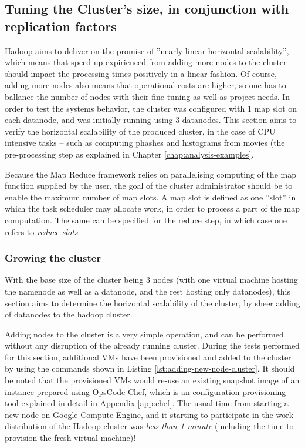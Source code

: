 \subsection{Tuning the Cluster's size, in conjunction with replication factors}
\label{sec:tuning-number-of-nodes}
Hadoop aims to deliver on the promise of ''nearly linear horizontal scalability'', which means that speed-up expirienced from adding more nodes to the cluster should impact the processing times positively in a linear fashion. Of course, adding more nodes also means that operational costs are higher, so one has to ballance the number of nodes with their fine-tuning as well as project needs. In order to test the systems behavior, the cluster was configured with 1 map slot on each datanode, and was initially running using 3 datanodes. This section aims to verify the horizontal scalability of the produced cluster, in the case of CPU intensive tasks -- such as computing phashes and histograms from movies (the pre-processing step as explained in Chapter \ref{chap:analysis-examples}.

Because the Map Reduce framework relies on parallelising computing of the map function supplied by the user, the goal of the cluster administrator should be to enable the maximum number of map slots. A map slot is defined as one ''slot'' in which the task scheduler may allocate work, in order to process a part of the map computation. The same can be specified for the reduce step, in which case one refers to \textit{reduce slots}.

\subsubsection{Growing the cluster}
With the base size of the cluster being 3 nodes (with one virtual machine hosting the namenode as well as a datanode, and the rest hosting only datanodes), this section aims to determine the horizontal scalability of the cluster, by sheer adding of datanodes to the hadoop cluster.

Adding nodes to the cluster is a very simple operation, and can be performed without any disruption of the already running cluster. During the tests performed for this section, additional VMs have been provisioned and added to the cluster by using the commands shown in Listing \ref{lst:adding-new-node-cluster}. It should be noted that the provisioned VMs would re-use an existing snapshot image of an instance prepared using OpsCode Chef, which is an configuration provisioning tool explained in detail in Appendix \ref{app:chef}. The usual time from starting a new node on Google Compute Engine, and it starting to participate in the work distribution of the Hadoop cluster was \textit{less than 1 minute} (including the time to provision the fresh virtual machine)!

